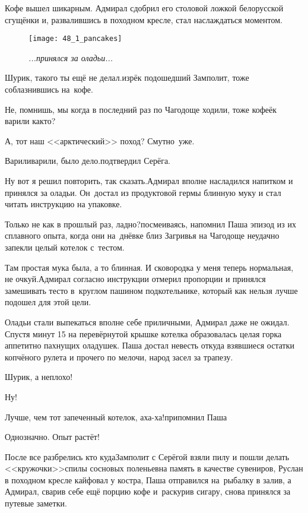 Кофе вышел шикарным. Адмирал сдобрил его столовой ложкой белорусской сгущёнки и, развалившись в походном кресле, стал наслаждаться моментом.

\newpage

\begin{wrapfigure}[20]{r}{0.58\textwidth}
	\centering
	\texttt{[image: 48\_1\_pancakes]}
	\caption{\small\textit{...принялся за оладьи...}}
\end{wrapfigure}
\diagdash Шурик, такого ты ещё не делал.\mdash изрёк подошедший Замполит, тоже соблазнившись на~кофе.

\diagdash Не, помнишь, мы когда в последний раз по Чагодоще ходили, тоже кофеёк варили как\sdash то?

\diagdash А, тот наш <<арктический>> поход? Смутно~уже.

\diagdash Варили\sdash варили, было дело.\mdash подтвердил Серёга.

\diagdash Ну вот я решил повторить, так сказать.\mdash Адмирал вполне насладился напитком и принялся за оладьи. Он~достал из продуктовой гермы блинную муку и стал читать инструкцию на упаковке.

\diagdash Только не как в прошлый раз, ладно?\mdash посмеиваясь, напомнил Паша эпизод из их сплавного опыта, когда они на~днёвке близ Загривья на Чагодоще неудачно запекли целый котелок с~тестом.

\diagdash Там простая мука была, а то блинная. И сковородка у меня теперь нормальная, не очкуй.\mdash Адмирал согласно инструкции отмерил пропорции и принялся замешивать тесто в~круглом пашином подкотельнике, который как нельзя лучше подошел для этой цели.

Оладьи стали выпекаться вполне себе приличными, Адмирал даже не ожидал. Спустя минут 15 на перевёрнутой крышке котелка образовалась целая горка аппетитно пахнущих оладушек. Паша достал невесть откуда взявшиеся остатки копчёного рулета и прочего по мелочи, народ засел за трапезу.

\diagdash Шурик, а неплохо!

\diagdash Ну!

\diagdash Лучше, чем тот запеченный котелок, аха-ха!\mdash припомнил Паша

\diagdash Однозначно. Опыт растёт!

После все разбрелись кто куда\mdash Замполит с Серёгой взяли пилу и пошли делать <<кружочки>>\mdash спилы сосновых поленьев\mdash на память в качестве сувениров, Руслан в походном кресле кайфовал у костра, Паша отправился на~рыбалку в залив, а Адмирал, сварив себе ещё порцию кофе и~раскурив сигару, снова принялся за путевые заметки.

